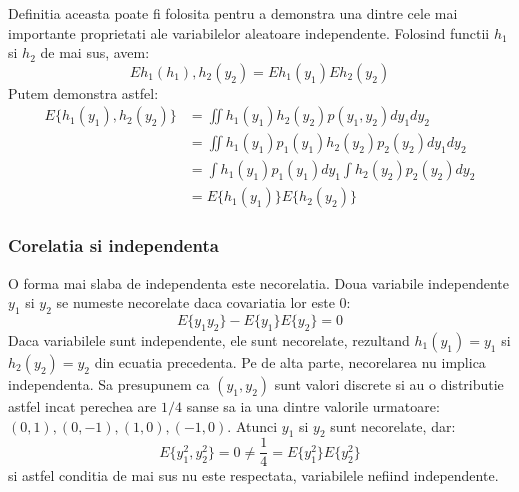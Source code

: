 \documentclass[12pt]{article}
\begin{document}
Definitia aceasta poate fi folosita pentru a demonstra una dintre cele mai importante proprietati ale variabilelor aleatoare independente. Folosind functii $h_1$ si $h_2$ de mai sus, avem:
\begin{equation}
E{h_1(h_1),h_2(y_2)}=E{h_1(y_1)}E{h_2(y_2)}
\end{equation}
Putem demonstra astfel:
\begin{equation}
\begin{split}
E\{h_1(y_1),h_2(y_2)\} & =\iint{h_1(y_1)h_2(y_2)p(y_1,y_2)dy_1dy_2} \\ 
& =\iint{h_1(y_1)p_1(y_1)h_2(y_2)p_2(y_2)dy_1dy_2} \\
& =\int{h_1(y_1)p_1(y_1)dy_1}\int{h_2(y_2)p_2(y_2)dy_2}\\ 
& =E\{h_1(y_1)\}E\{h_2(y_2)\}
\end{split}
\end{equation}

\subsubsection{Corelatia si independenta}
O forma mai slaba de independenta este necorelatia. Doua variabile independente $y_1$ si $y_2$ se numeste necorelate daca covariatia lor este 0:
\begin{equation}
	E\{y_1y_2\}-E\{y_1\}E\{y_2\}=0
\end{equation}
Daca variabilele sunt independente, ele sunt necorelate, rezultand $h_1(y_1)=y_1$ si $h_2(y_2)=y_2$ din ecuatia precedenta.
Pe de alta parte, necorelarea nu implica independenta. Sa presupunem ca $(y_1,y_2)$ sunt valori discrete si au o distributie astfel incat perechea are $1/4$ sanse sa ia una dintre valorile urmatoare: $(0,1),(0,-1),(1,0),(-1,0)$. Atunci $y_1$ si $y_2$ sunt necorelate, dar:
\begin{equation}
E\{y_1^2, y_2^2\}=0 \neq \frac{1}{4} = E\{y_1^2\}E\{y_2^2\}
\end{equation}
si astfel conditia de mai sus nu este respectata, variabilele nefiind independente.
\end{document}
